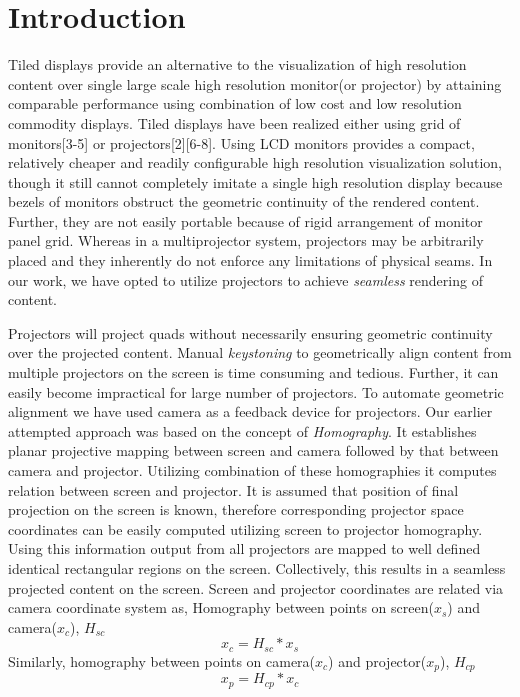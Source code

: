 \documentclass[conference]{/home/pranav/Desktop/Publication_work/latex_class_files/IEEEtran}
\begin{document}
\section{Introduction}
Tiled displays provide an alternative to the visualization of high resolution content over single large scale high resolution monitor(or projector) by attaining comparable performance using combination of low cost and low resolution commodity displays. Tiled displays have been realized either using grid of monitors[3-5] or projectors[2][6-8]. Using LCD monitors provides a compact, relatively cheaper and readily configurable high resolution visualization solution, though it still cannot completely imitate a single high resolution display because bezels of monitors obstruct the geometric continuity of the rendered content. Further, they are not easily portable because of rigid arrangement of monitor panel grid. Whereas in a multiprojector system, projectors may be arbitrarily placed and they inherently do not enforce any limitations of physical seams. In our work, we have opted to utilize projectors to achieve \textit{seamless} rendering of content. \par
Projectors will project quads without necessarily ensuring geometric continuity over the projected content. Manual \textit{keystoning} to geometrically align content from multiple projectors on the screen is time consuming and tedious. Further, it can easily become impractical for large number of projectors. To automate geometric alignment we have used camera as a feedback device for projectors. Our earlier attempted approach was based on the concept of \textit{Homography}\cite{9}. It establishes planar projective mapping between screen and camera followed by that between camera and projector. Utilizing combination of these homographies it computes relation between screen and projector. It is assumed that position of final projection on the screen is known, therefore corresponding projector space coordinates can be easily computed utilizing screen to projector homography. Using this information output from all projectors are mapped to well defined identical rectangular regions on the screen. Collectively, this results in a seamless projected content on the screen. Screen and projector coordinates are related via camera coordinate system as,\newline
Homography between points on screen($x_s$) and camera($x_c$), $H_{sc}$
\begin{equation}
x_{c}=H_{sc}*x_{s}
\label{hsc}
\end{equation}
Similarly, homography between points on camera($x_c$) and projector($x_p$), $H_{cp}$
\begin{equation}
x_{p}=H_{cp}*x_{c}
\label{hcp}
\end{equation}
\end{document}
